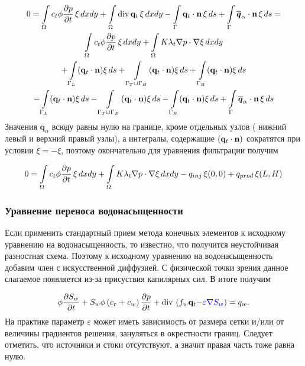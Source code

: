 \begin{multline}
	\displaystyle 0=\int\limits_\Omega c_t\phi \dfrac{\partial p}{\partial t}\, \xi \,dx dy 
	 + \int\limits_\Omega \operatorname{div}{\mathbf{q}_t}\, \xi \,dx dy
	 - \int\limits_{\Gamma} \mathbf{q}_t\cdot \mathbf{n} \, \xi \,ds 
	 + \int\limits_{\Gamma} \overline{\bm{q}}_{\alpha}\cdot \mathbf{n} \, \xi \,ds = \\ 
	 \int\limits_\Omega c_t\phi \dfrac{\partial p}{\partial t}\, \xi \,dx dy 
	 + \int\limits_\Omega K \lambda_t \nabla p \cdot \nabla\xi \,dx dy \\
	 +\int\limits_{\Gamma_L} (\mathbf{q}_t \cdot \mathbf{n}) \xi \, ds
	 +\int\limits_{\Gamma_T\cup \Gamma_B} (\mathbf{q}_t \cdot \mathbf{n}) \xi \, ds
	 +\int\limits_{\Gamma_R} (\mathbf{q}_t \cdot \mathbf{n}) \xi \, ds \\
	 -\int\limits_{\Gamma_L} (\mathbf{q}_t \cdot \mathbf{n}) \xi \, ds
	 -\int\limits_{\Gamma_T\cup \Gamma_B} (\mathbf{q}_t \cdot \mathbf{n}) \xi \, ds
	 -\int\limits_{\Gamma_R} (\mathbf{q}_t \cdot \mathbf{n}) \xi \, ds 
	 +\int\limits_{\Gamma} \overline{\bm{q}}_{\alpha}\cdot \mathbf{n} \, \xi \, ds\\ 
\end{multline}
Значения $\overline{\bm{q}}_{\alpha}$ всюду равны нулю на границе, кроме отдельных узлов (
нижний левый и верхний правый узлы), а интегралы, содержащие $(\mathbf{q}_t \cdot \mathbf{n})$ сократятся
при условии $\overline{\xi} = -\xi$, поэтому окончательно для уравнения фильтрации получим

\begin{equation}
	0=\int\limits_\Omega c_t\phi \dfrac{\partial p}{\partial t}\, \xi \,dx dy 
	+ \int\limits_\Omega K \lambda_t \nabla p \cdot \nabla\xi \,dx dy - q_{inj}\, \xi(0,0)
	+ q_{prod}\, \xi(L,H)
\end{equation}

\subsubsection{Уравнение переноса водонасыщенности}

Если применить стандартный прием метода конечных элементов к исходному уравнению на водонасыщенность, то известно, что получится неустойчивая разностная схема. 
Поэтому к исходному уравнению на водонасыщенность добавим член с искусственной диффузией. С физической точки зрения данное слагаемое появляется из-за присуствия капилярных сил. В итоге получим 

\begin{equation}\label{eq:satur_diffusion}
	\phi \dfrac{\partial S_w}{\partial t} + S_w\phi\left(c_r + c_w \right)\dfrac{\partial p}{\partial t} + \operatorname{div}\, \left( f_w \mathbf{q}_t {- \color{blue}\varepsilon \nabla S_w} \right) = 
	q_w.
\end{equation}
На практике параметр $\varepsilon$ может иметь зависимость от размера сетки и/или от 
величины градиентов решения, зануляться в окрестности границ. Следует отметить, что источники и стоки
отсутствуют, а значит правая часть  тоже равна нулю.

